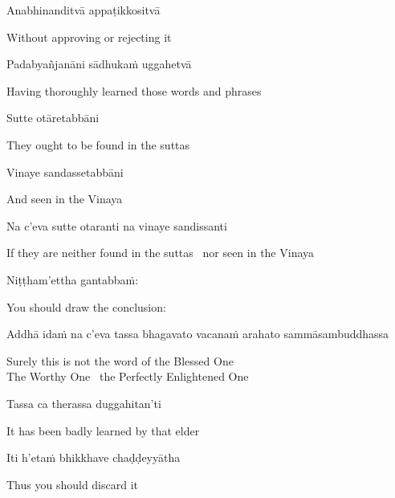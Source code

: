 Anabhinanditvā appaṭikkositvā

\begin{english}
  Without approving or rejecting it
\end{english}

Padabyañjanāni sādhukaṁ uggahetvā

\begin{english}
  Having thoroughly learned those words and phrases
\end{english}

Sutte otāretabbāni

\begin{english}
  They ought to be found in the suttas
\end{english}

Vinaye sandassetabbāni

\begin{english}
  And seen in the Vinaya
\end{english}

Na c'eva sutte otaranti na vinaye sandissanti

\begin{english}
  If they are neither found in the suttas \breathmark\ nor seen in the Vinaya
\end{english}

Niṭṭham'ettha gantabbaṁ:

\begin{english}
  You should draw the conclusion:
\end{english}

\begin{pali-hang}
  Addhā idaṁ na c'eva tassa bhagavato vacanaṁ arahato sammāsambuddhassa
\end{pali-hang}

\begin{english}
  Surely this is not the word of the Blessed One\\
  The Worthy One \breathmark\ the Perfectly Enlightened One
\end{english}

Tassa ca therassa duggahitan'ti

\begin{english}
  It has been badly learned by that elder
\end{english}

Iti h'etaṁ bhikkhave chaḍḍeyyātha

\begin{english}
  Thus you should discard it
\end{english}

